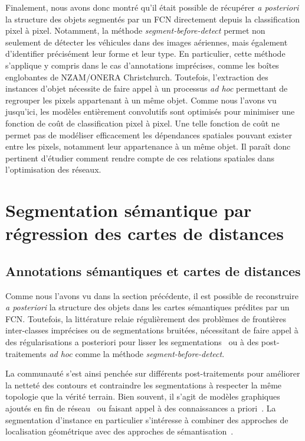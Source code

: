 Finalement, nous avons donc montré qu'il était possible de récupérer \emph{a posteriori} la structure des objets segmentés par un \gls{FCN} directement depuis la classification pixel à pixel. Notamment, la méthode \emph{segment-before-detect} permet non seulement de détecter les véhicules dans des images aériennes, mais également d'identifier précisément leur forme et leur type. En particulier, cette méthode s'applique y compris dans le cas d'annotations imprécises, comme les boîtes englobantes de NZAM/ONERA Christchurch.
Toutefois, l'extraction des instances d'objet nécessite de faire appel à un processus \emph{ad hoc} permettant de regrouper les pixels appartenant à un même objet. Comme nous l'avons vu jusqu'ici, les modèles entièrement convolutifs sont optimisés pour minimiser une fonction de coût de classification pixel à pixel. Une telle fonction de coût ne permet pas de modéliser efficacement les dépendances spatiales pouvant exister entre les pixels, notamment leur appartenance à un même objet. Il paraît donc pertinent d'étudier comment rendre compte de ces relations spatiales dans l'optimisation des réseaux.

\section{Segmentation sémantique par régression des cartes de distances}
\label{sec:cds}

\subsection{Annotations sémantiques et cartes de distances}

Comme nous l'avons vu dans la section précédente, il est possible de reconstruire \emph{a posteriori} la structure des objets dans les cartes sémantiques prédites par un \gls{FCN}. Toutefois, la littérature relaie régulièrement des problèmes de frontières inter-classes imprécises ou de segmentations bruitées, nécessitant de faire appel à des régularisations a posteriori pour lisser les segmentations~\cite{zheng_conditional_2015,chen_deeplab_2018} ou à des post-traitements \emph{ad hoc} comme la méthode \emph{segment-before-detect}.

La communauté s'est ainsi penchée sur différents post-traitements pour améliorer la netteté des contours et contraindre les segmentations à respecter la même topologie que la vérité terrain. Bien souvent, il s'agit de modèles graphiques ajoutés en fin de réseau~\cite{liu_deep_2018} ou faisant appel à des connaissances a priori~\cite{le_reformulating_2018,bertasius_semantic_2016}. La segmentation d'instance en particulier s'intéresse à combiner des approches de localisation géométrique avec des approches de sémantisation~\cite{he_mask_2017,dai_instance-aware_2016}.


